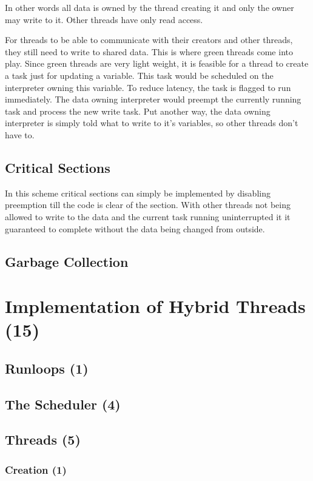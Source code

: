 \documentclass[bachelor,english]{hgbthesis}
\begin{document}
In other words all data is owned by the thread creating it and only the owner may write to it. Other threads have only read access.

For threads to be able to communicate with their creators and other threads, they still need to write to shared data. This is where green threads come into play. Since green threads are very light weight, it is feasible for a thread to create a task just for updating a variable. This task would be scheduled on the interpreter owning this variable. To reduce latency, the task is flagged to run immediately. The data owning interpreter would preempt the currently running task and process the new write task. Put another way, the data owning interpreter is simply told what to write to it's variables, so other threads don't have to.

\section{Critical Sections}

In this scheme critical sections can simply be implemented by disabling preemption till the code is clear of the section. With other threads not being allowed to write to the data and the current task running uninterrupted it it guaranteed to complete without the data being changed from outside.

\section{Garbage Collection}

\chapter{Implementation of Hybrid Threads (15)}

\section{Runloops (1)}

\section{The Scheduler (4)}

\section{Threads (5)}

\subsection{Creation (1)}
\end{document}
